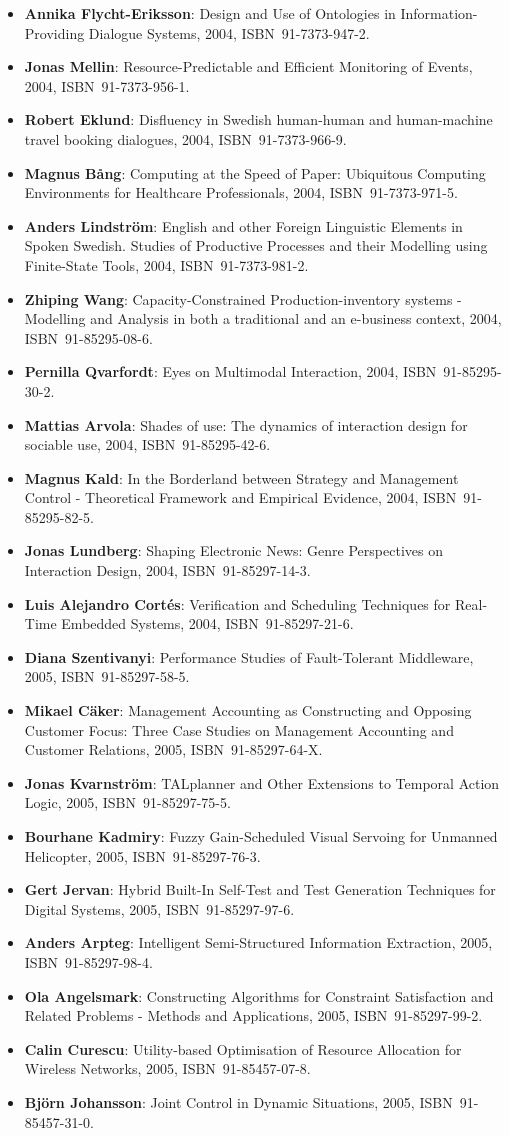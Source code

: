 \documentclass[a4paper,showtrims,twocolumn]{memoir}
\newenvironment{theses}{
  \begin{itemize}
    \setlength{\itemsep}{0.2em}
    \setlength{\parskip}{0em}
    \setlength{\parsep}{0em}
}{
  \end{itemize}
}
\newcommand{\thesis}[5]{\item[No. #1] \textbf{#2}: #3, #4, ISBN~#5.}
\begin{document}
\begin{theses}
    \thesis{874}{Annika Flycht-Eriksson}{Design and Use of Ontologies in Information-Providing Dialogue Systems}{2004}{91-7373-947-2}
    \thesis{876}{Jonas Mellin}{Resource-Predictable and Efficient Monitoring of Events}{2004}{91-7373-956-1}
    \thesis{882}{Robert Eklund}{Disfluency in Swedish human-human and human-machine travel booking dialogues}{2004}{91-7373-966-9}
    \thesis{883}{Magnus Bång}{Computing at the Speed of Paper: Ubiquitous Computing Environments for Healthcare Professionals}{2004}{91-7373-971-5}
    \thesis{887}{Anders Lindström}{English and other Foreign Linguistic Elements in Spoken Swedish. Studies of Productive Processes and their Modelling using Finite-State Tools}{2004}{91-7373-981-2}
    \thesis{889}{Zhiping Wang}{Capacity-Constrained Production-inventory systems - Modelling and Analysis in both a traditional and an e-business context}{2004}{91-85295-08-6}
    \thesis{893}{Pernilla Qvarfordt}{Eyes on Multimodal Interaction}{2004}{91-85295-30-2}
    \thesis{900}{Mattias Arvola}{Shades of use: The dynamics of interaction design for sociable use}{2004}{91-85295-42-6}
    \thesis{910}{Magnus Kald}{In the Borderland between Strategy and Management Control - Theoretical Framework and Empirical Evidence}{2004}{91-85295-82-5}
    \thesis{918}{Jonas Lundberg}{Shaping Electronic News: Genre Perspectives on Interaction Design}{2004}{91-85297-14-3}
    \thesis{920}{Luis Alejandro Cortés}{Verification and Scheduling Techniques for Real-Time Embedded Systems}{2004}{91-85297-21-6}
    \thesis{929}{Diana Szentivanyi}{Performance Studies of Fault-Tolerant Middleware}{2005}{91-85297-58-5}
    \thesis{933}{Mikael Cäker}{Management Accounting as Constructing and Opposing Customer Focus: Three Case Studies on Management Accounting and Customer Relations}{2005}{91-85297-64-X}
    \thesis{937}{Jonas Kvarnström}{TALplanner and Other Extensions to Temporal Action Logic}{2005}{91-85297-75-5}
    \thesis{938}{Bourhane Kadmiry}{Fuzzy Gain-Scheduled Visual Servoing for Unmanned Helicopter}{2005}{91-85297-76-3}
    \thesis{945}{Gert Jervan}{Hybrid Built-In Self-Test and Test Generation Techniques for Digital Systems}{2005}{91-85297-97-6}
    \thesis{946}{Anders Arpteg}{Intelligent Semi-Structured Information Extraction}{2005}{91-85297-98-4}
    \thesis{947}{Ola Angelsmark}{Constructing Algorithms for Constraint Satisfaction and Related Problems - Methods and Applications}{2005}{91-85297-99-2}
    \thesis{963}{Calin Curescu}{Utility-based Optimisation of Resource Allocation for Wireless Networks}{2005}{91-85457-07-8}
    \thesis{972}{Björn Johansson}{Joint Control in Dynamic Situations}{2005}{91-85457-31-0}

\end{theses}
\end{document}
